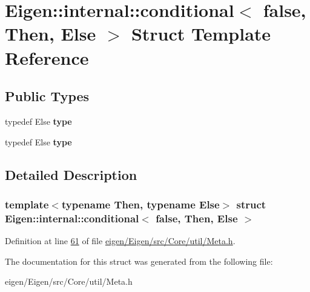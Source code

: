 \hypertarget{struct_eigen_1_1internal_1_1conditional_3_01false_00_01_then_00_01_else_01_4}{}\section{Eigen\+:\+:internal\+:\+:conditional$<$ false, Then, Else $>$ Struct Template Reference}
\label{struct_eigen_1_1internal_1_1conditional_3_01false_00_01_then_00_01_else_01_4}
\subsection*{Public Types}
\begin{DoxyCompactItemize}
\item 
\mbox{\label{struct_eigen_1_1internal_1_1conditional_3_01false_00_01_then_00_01_else_01_4_ab754baa99b87660a6bd1b30769da3753}} 
typedef Else {\bfseries type}
\item 
\mbox{\label{struct_eigen_1_1internal_1_1conditional_3_01false_00_01_then_00_01_else_01_4_ab754baa99b87660a6bd1b30769da3753}} 
typedef Else {\bfseries type}
\end{DoxyCompactItemize}


\subsection{Detailed Description}
\subsubsection*{template$<$typename Then, typename Else$>$\newline
struct Eigen\+::internal\+::conditional$<$ false, Then, Else $>$}



Definition at line \hyperlink{eigen_2_eigen_2src_2_core_2util_2_meta_8h_source_l00061}{61} of file \hyperlink{eigen_2_eigen_2src_2_core_2util_2_meta_8h_source}{eigen/\+Eigen/src/\+Core/util/\+Meta.\+h}.



The documentation for this struct was generated from the following file\+:\begin{DoxyCompactItemize}
\item 
eigen/\+Eigen/src/\+Core/util/\+Meta.\+h\end{DoxyCompactItemize}
